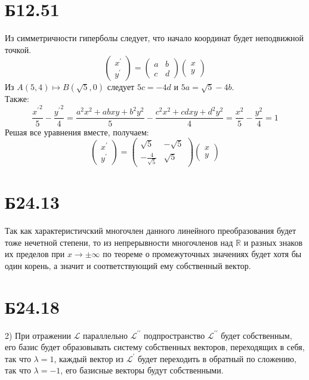 \documentclass[a4paper,12pt]{article} %
\begin{document}
\section*{Б12.51} Из симметричности гиперболы следует, что начало координат будет неподвижной точкой.
$$\begin{pmatrix*}
    x^{\prime}\\y^{\prime}
\end{pmatrix*}=\begin{pmatrix*}
    a&b\\
    c&d
\end{pmatrix*}\begin{pmatrix*}
    x\\y
\end{pmatrix*}$$
Из $A(5,4)\mapsto B(\sqrt{5},0)$ следует $5c=-4d$ и $5a=\sqrt{5}-4b$.\\
Также:
$$\frac{{x^{\prime}}^{2}}{5}-\frac{{y^{\prime}}^{2}}{4}=\frac{a^2x^2+abxy+b^2y^2}{5}-\frac{c^2x^2+cdxy+d^2y^2}{4}=\frac{x^{2}}{5}-\frac{y^{2}}{4}=1$$
Решая все уравнения вместе, получаем:
$$\begin{pmatrix*}
    x^{\prime}\\y^{\prime}
\end{pmatrix*}=\begin{pmatrix*}
    \sqrt{5}&-\sqrt{5}\\
    -\frac{4}{\sqrt{5}}&\sqrt{5}
\end{pmatrix*}\begin{pmatrix*}
    x\\y
\end{pmatrix*}$$
\section*{Б24.13} Так как характеристичский многочлен данного линейного преобразования будет тоже нечетной степени, то из непрерывности многочленов над $\mathbb{R}$ и разных знаков их пределов при $x\to\pm\infty$ по теореме о промежуточных значениях будет хотя бы один корень, а значит и соответствующий ему собственный вектор.
\section*{Б24.18}2) При отражении $\mathcal{L}$ параллельно $\mathcal{L}^{\prime\prime}$ подпространство $\mathcal{L}^{\prime\prime}$ будет собственным, его базис будет образовывать систему собственных векторов, переходящих в себя, так что $\lambda=1$, каждый вектор из $\mathcal{L}^{\prime}$ будет переходить в обратный по сложению, так что $\lambda=-1$, его базисные векторы будут собственными.
\end{document}
